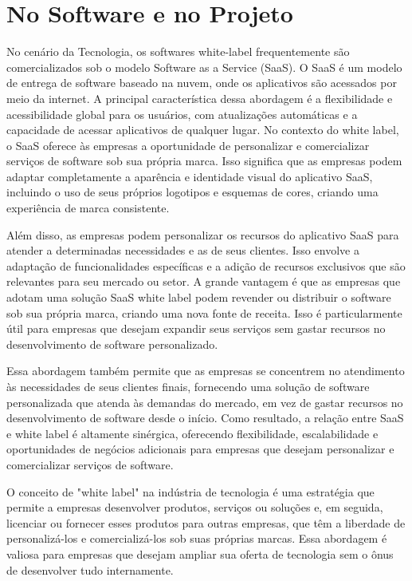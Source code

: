 \section{No Software e no Projeto}

No cenário da Tecnologia, os softwares white-label frequentemente são comercializados sob o modelo Software as a Service (SaaS). O SaaS é um modelo de entrega de software baseado na nuvem, onde os aplicativos são acessados por meio da internet. A principal característica dessa abordagem é a flexibilidade e acessibilidade global para os usuários, com atualizações automáticas e a capacidade de acessar aplicativos de qualquer lugar. No contexto do white label, o SaaS oferece às empresas a oportunidade de personalizar e comercializar serviços de software sob sua própria marca. Isso significa que as empresas podem adaptar completamente a aparência e identidade visual do aplicativo SaaS, incluindo o uso de seus próprios logotipos e esquemas de cores, criando uma experiência de marca consistente.

Além disso, as empresas podem personalizar os recursos do aplicativo SaaS para atender a determinadas necessidades e as de seus clientes. Isso envolve a adaptação de funcionalidades específicas e a adição de recursos exclusivos que são relevantes para seu mercado ou setor. A grande vantagem é que as empresas que adotam uma solução SaaS white label podem revender ou distribuir o software sob sua própria marca, criando uma nova fonte de receita. Isso é particularmente útil para empresas que desejam expandir seus serviços sem gastar recursos no desenvolvimento de software personalizado.

Essa abordagem também permite que as empresas se concentrem no atendimento às necessidades de seus clientes finais, fornecendo uma solução de software personalizada que atenda às demandas do mercado, em vez de gastar recursos no desenvolvimento de software desde o início. Como resultado, a relação entre SaaS e white label é altamente sinérgica, oferecendo flexibilidade, escalabilidade e oportunidades de negócios adicionais para empresas que desejam personalizar e comercializar serviços de software.

O conceito de "white label" na indústria de tecnologia é uma estratégia que permite a empresas desenvolver produtos, serviços ou soluções e, em seguida, licenciar ou fornecer esses produtos para outras empresas, que têm a liberdade de personalizá-los e comercializá-los sob suas próprias marcas. Essa abordagem é valiosa para empresas que desejam ampliar sua oferta de tecnologia sem o ônus de desenvolver tudo internamente. 


